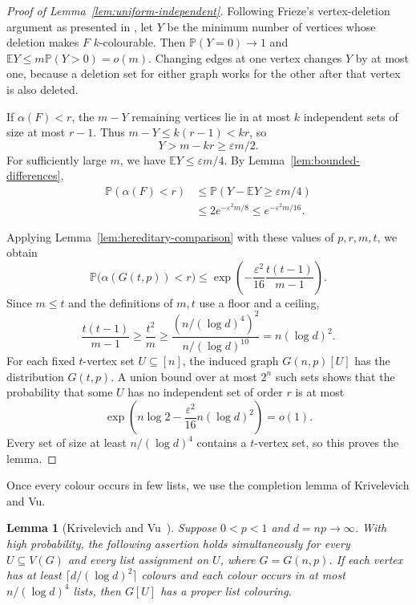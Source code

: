 \documentclass[11pt]{article}
\newtheorem{lemma}[theorem]{Lemma}
\numberwithin{equation}{section}
\newcommand{\Prob}{\mathbb P}
\newcommand{\E}{\mathbb E}
\begin{document}
\begin{proof}[Proof of Lemma~\ref{lem:uniform-independent}]
Following Frieze's vertex-deletion argument as presented in \cite[p.~154]{McDiarmid1989}, let $Y$ be the minimum number of vertices whose deletion makes $F$ $k$-colourable. Then $\Prob(Y=0)\to1$ and $\E Y\le m\Prob(Y>0)=o(m)$. Changing edges at one vertex changes $Y$ by at most one, because a deletion set for either graph works for the other after that vertex is also deleted.

If $\alpha(F)<r$, the $m-Y$ remaining vertices lie in at most $k$ independent sets of size at most $r-1$. Thus $m-Y\le k(r-1)<kr$, so
\[
 Y>m-kr\ge\varepsilon m/2.
\]
For sufficiently large $m$, we have $\E Y\le\varepsilon m/4$. By Lemma~\ref{lem:bounded-differences},
\begin{equation}\label{eq:small-graph-tail}
 \begin{aligned}
 \Prob(\alpha(F)<r)
 &\le\Prob(Y-\E Y\ge\varepsilon m/4)\\
 &\le2e^{-\varepsilon^2m/8}
 \le e^{-\varepsilon^2m/16}.
 \end{aligned}
\end{equation}

Applying Lemma~\ref{lem:hereditary-comparison} with these values of $p,r,m,t$, we obtain
\[
 \Prob\bigl(\alpha(G(t,p))<r\bigr)
 \le\exp\left(-\frac{\varepsilon^2}{16}
                       \frac{t(t-1)}{m-1}\right).
\]
Since $m\le t$ and the definitions of $m,t$ use a floor and a ceiling,
\[
 \frac{t(t-1)}{m-1}
 \ge\frac{t^2}{m}
 \ge\frac{(n/(\log d)^4)^2}{n/(\log d)^{10}}
 =n(\log d)^2.
\]
For each fixed $t$-vertex set $U\subseteq[n]$, the induced graph $G(n,p)[U]$ has the distribution $G(t,p)$. A union bound over at most $2^n$ such sets shows that the probability that some $U$ has no independent set of order $r$ is at most
\[
 \exp\left(n\log2-\frac{\varepsilon^2}{16}n(\log d)^2\right)
 =o(1).
\]
Every set of size at least $n/(\log d)^4$ contains a $t$-vertex set, so this proves the lemma.
\end{proof}

Once every colour occurs in few lists, we use the completion lemma of Krivelevich and Vu.

\begin{lemma}[Krivelevich and Vu~{\cite[Lemma~3.1]{KV}}]\label{lem:KV}
Suppose $0<p<1$ and $d=np\to\infty$. With high probability, the following assertion holds simultaneously for every $U\subseteq V(G)$ and every list assignment on $U$, where $G=G(n,p)$. If each vertex has at least $\lceil d/(\log d)^2\rceil$ colours and each colour occurs in at most $n/(\log d)^4$ lists, then $G[U]$ has a proper list colouring.
\end{lemma}
\end{document}
